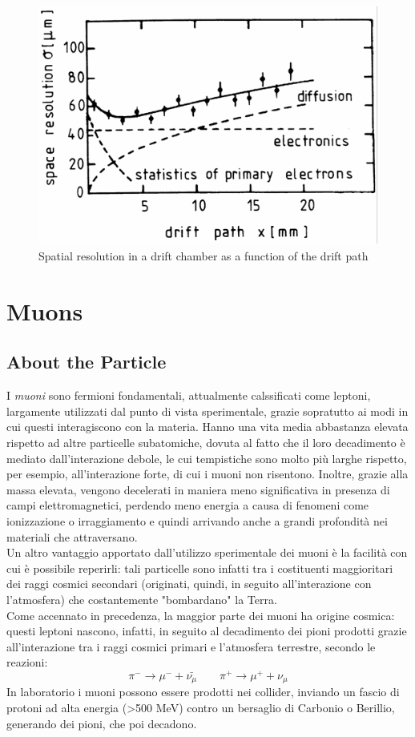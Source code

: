 \documentclass[a4paper,11pt]{book}
\begin{document}
\begin{figure}[hbtp]
\centering
\includegraphics[scale=1.5]{pictures/drift_chamber_resolution.pdf}
\caption{Spatial resolution in a drift chamber as a function of the drift path}
\label{fig:drift_resolution}
\end{figure}


\chapter{Muons}

\section{About the Particle}
I \textit{muoni} sono fermioni fondamentali, attualmente calssificati come leptoni, largamente utilizzati dal punto di vista sperimentale, grazie sopratutto ai modi in cui questi interagiscono con la materia. Hanno una vita media abbastanza elevata rispetto ad altre particelle subatomiche, dovuta al fatto che il loro decadimento è mediato dall'interazione debole, le cui tempistiche sono 
molto più larghe rispetto, per esempio, all'interazione forte, di cui i muoni non risentono. Inoltre, grazie alla massa elevata, vengono decelerati in maniera meno significativa in presenza di campi elettromagnetici, perdendo meno energia a causa di fenomeni come ionizzazione o irraggiamento e quindi arrivando anche a grandi profondità nei materiali che attraversano.\\
Un altro vantaggio apportato dall'utilizzo sperimentale dei muoni è la facilità con cui è possibile reperirli: tali particelle sono infatti tra i costituenti maggioritari dei raggi cosmici secondari (originati, quindi, in seguito all'interazione con l'atmosfera) che costantemente "bombardano" la Terra.\\
Come accennato in precedenza, la maggior parte dei muoni ha origine cosmica: questi leptoni nascono, infatti, in seguito al decadimento dei pioni prodotti grazie all'interazione tra i raggi cosmici primari e l'atmosfera terrestre, secondo le reazioni:
\[ \pi^- \to \mu^- + \bar{\nu_\mu} \qquad \pi^+ \to \mu^+ + \nu_\mu \]
In laboratorio i muoni possono essere prodotti nei collider, inviando un fascio di protoni ad alta energia (\textgreater 500 MeV) contro un bersaglio di Carbonio o Berillio, generando dei pioni, che poi decadono.
\end{document}
